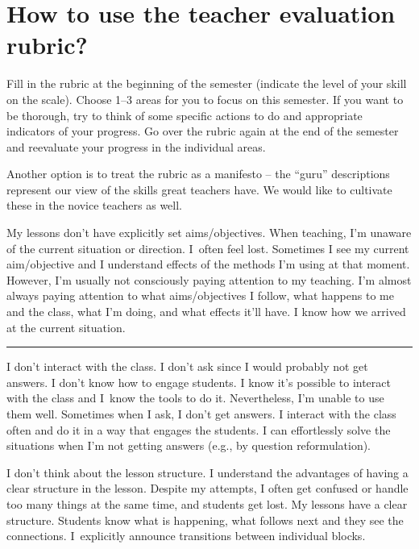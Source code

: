 \section*{How to use the teacher evaluation rubric?}

Fill in the rubric at the beginning of the semester (indicate the level of your skill on the scale). Choose 1--3 areas for you to focus on this semester. If you want to be thorough, try to think of some specific actions to do and appropriate indicators of your progress. Go over the rubric again at the end of the semester and reevaluate your progress in the individual areas.

Another option is to treat the rubric as a manifesto -- the \enquote{guru} descriptions represent our view of the skills great teachers have. We would like to cultivate these in the novice teachers as well.


\newpage
{}
{My lessons don't have explicitly set aims/objectives. When teaching, I'm unaware of the current situation or direction. I~often feel lost.}
{Sometimes I see my current aim/objective and I understand effects of the methods I'm using at that moment. However, I'm usually not consciously paying attention to my teaching.}
{I'm almost always paying attention to what aims/objectives I follow, what happens to me and the class, what I'm doing, and what effects it'll have. I know how we arrived at the current situation.}

\rule{\textwidth}{0.4pt}
{I don't interact with the class. I don't ask since I would probably not get answers. I don't know how to engage students.}
{I know it's possible to interact with the class and I~know the tools to do it. Nevertheless, I'm unable to use them well. Sometimes when I ask, I don't get answers.}
{I interact with the class often and do it in a way that engages the students. I can effortlessly solve the situations when I'm not getting answers (e.g., by question reformulation).}

\newpage
{}
{I don't think about the lesson structure.}
{I understand the advantages of having a clear structure in the lesson. Despite my attempts, I often get confused or handle too many things at the same time, and students get lost.}
{My lessons have a clear structure. Students know what is happening, what follows next and they see the connections. I~explicitly announce transitions between individual blocks.}


